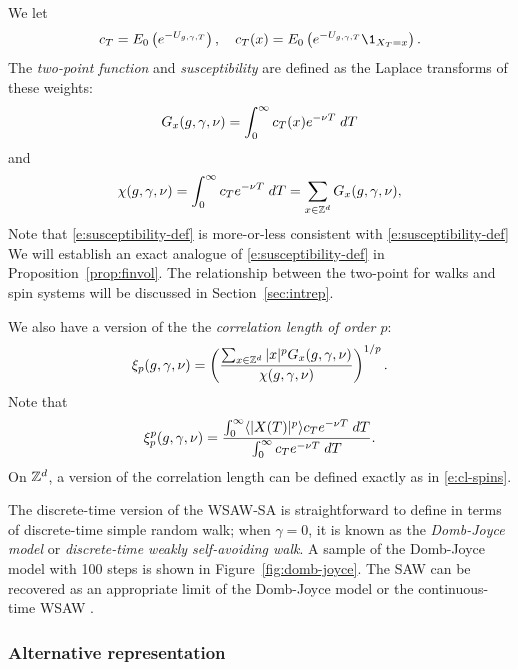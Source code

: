 We let
\begin{equation}
\label{e:c}
c_T = E_0\left(e^{-U_{\gcc,\gamma,T}}\right),
	\quad
c_T(x) = E_0\left(e^{-U_{\gcc,\gamma,T}}\1_{X_T = x}\right).
\end{equation}
The \emph{two-point function} and \emph{susceptibility} are defined
as the Laplace transforms of these weights:
\begin{equation}
\lbeq{Gsa}
G_x(\gcc,\gamma,\nu)
    =
\int_0^\infty c_T(x) e^{-\nu T} \; dT
\end{equation}
and
\begin{equation}
\label{e:suscept-def}
\chi(g, \gamma, \nu)
	=
\int_0^\infty c_T e^{-\nu T} \; dT
	=
\sum_{x\in{ {{\mathbb Z}}^d }} G_x(g,\gamma,\nu),
\end{equation}
Note that \eqref{e:susceptibility-def} is more-or-less consistent with \eqref{e:susceptibility-def}
We will establish an exact analogue of \eqref{e:susceptibility-def} in Proposition~\ref{prop:finvol}.
The relationship between the two-point for walks and spin systems will be
discussed in Section~\ref{sec:intrep}.

We also have a version of the the \emph{correlation length of order $p$}:
\begin{equation}
\label{e:clp-wsawsa}
\xi_p(g, \gamma, \nu)
	=
\left(\frac{\sum_{x\in{ {{\mathbb Z}}^d }} |x|^p G_x(g, \gamma, \nu)}{\chi(g, \gamma, \nu)}\right)^{1/p}.
\end{equation}
Note that
\begin{equation}
\xi_p^p(g,\gamma,\nu)
	=
\frac
{\int_0^\infty \langle |X(T)|^p \rangle c_T e^{-\nu T} \; dT}
{\int_0^\infty c_T e^{-\nu T} \; dT}.
\end{equation}
On ${ {{\mathbb Z}}^d }$, a version of the correlation length can be defined exactly as in \eqref{e:cl-spins}.

\begin{rk}
The discrete-time version of the WSAW-SA is straightforward to define in terms of
discrete-time simple random walk; when
$\gamma = 0$, it is known as the \emph{Domb-Joyce model} or \emph{discrete-time
weakly self-avoiding walk}. A sample of the Domb-Joyce model with 100 steps is shown
in Figure~\ref{fig:domb-joyce}. The SAW can be recovered as an
appropriate limit of the Domb-Joyce model or the continuous-time WSAW \cite{BDS12}.
\end{rk}

\subsubsection{Alternative representation}

